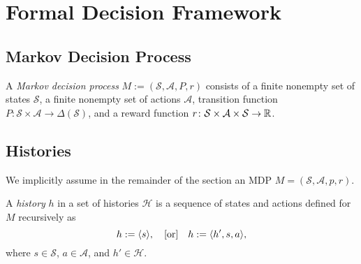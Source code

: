 
\section{Formal Decision Framework}

\subsection{Markov Decision Process}

\begin{definition} \label{def:MDP}
A \emph{Markov decision process} $M := (\mathcal{S}, \mathcal{A}, P, r)$ consists of a finite nonempty set of states $\mathcal{S}$, a finite nonempty set of actions $\mathcal{A}$, transition function $P\colon \mathcal{S} \times \mathcal{A} \to  \Delta(\mathcal{S})$, and a reward function $r \colon \mathcal{S} \times \mathcal{A} \times \mathcal{S} \to \mathbb{R}$.
\end{definition}

\subsection{Histories}

We implicitly assume in the remainder of the section an MDP $M = (\mathcal{S}, \mathcal{A}, p, r)$.
\begin{definition} \label{def:Hist}
A \emph{history} $h$ in a set of histories $\mathcal{H}$ is a sequence of states and actions defined for $M$ recursively as
\[
  h := \langle s \rangle, \quad
  \text{[or]} \quad
  h := \langle h', s, a \rangle,
\]
where $s \in \mathcal{S}$, $a\in \mathcal{A}$, and $h'\in \mathcal{H}$.
\end{definition}

